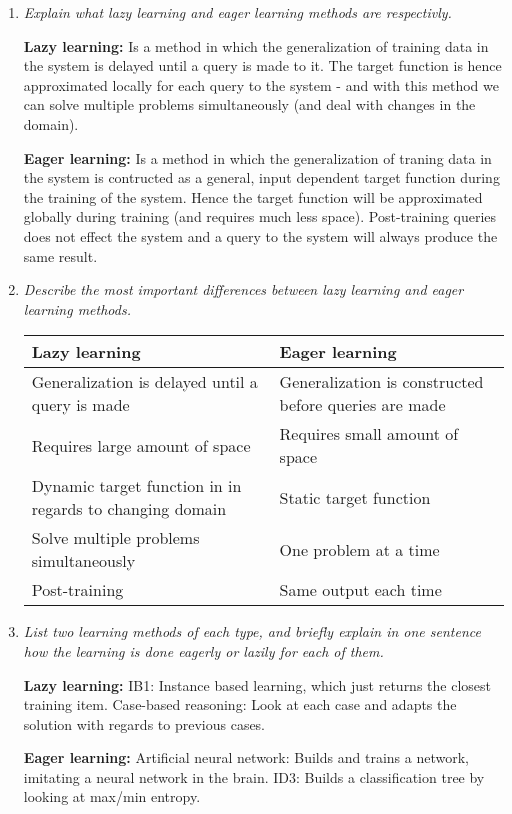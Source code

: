 \documentclass{article}
\begin{document}
\begin{enumerate}[1.]

\item \textit{ Explain what lazy learning and eager learning methods are
respectivly.}

{\bf Lazy learning:} Is a method in which the generalization of training data
in the system is delayed until a query is made to it. The target function is
hence approximated locally for each query to the system - and with this method
we can solve multiple problems simultaneously (and deal with changes in the
domain).

{\bf Eager learning:} Is a method in which the generalization of traning data
in the system is contructed as a general, input dependent target function
during the training of the system. Hence the target function will be
approximated globally during training (and requires much less space).
Post-training queries does not effect the system and a query to the system will
always produce the same result. 

\newpage

\item \textit{ Describe the most important differences between lazy learning and eager
learning methods.}

\begin{table}[ht]
  \begin{tabular}{p{6cm} p{6cm}} \hline
      {\bf Lazy learning}                   & {\bf Eager learning} \\ \hline
      Generalization is delayed until a query is made & Generalization is
      constructed before queries are made \\ \hline
      Requires large amount of space  & Requires small amount of space \\
      \hline
      Dynamic target function in in regards to changing domain & Static
target function \\ \hline
      Solve multiple problems simultaneously & One problem at a time \\ \hline
      Post-training                   & Same output each time \\ \hline
  \end{tabular}
\end{table}

\item \textit{ List two learning methods of each type, and briefly explain in one
sentence how the learning is done eagerly or lazily for each of them.}

{\bf Lazy learning:}
IB1: Instance based learning, which just returns the closest training item.
Case-based reasoning: Look at each case and adapts the solution with regards to
previous cases.

{\bf Eager learning:} 
Artificial neural network: Builds and trains a network, imitating a neural
network in the brain.
ID3: Builds a classification tree by looking at max/min entropy.

\end{enumerate}
\end{document}
